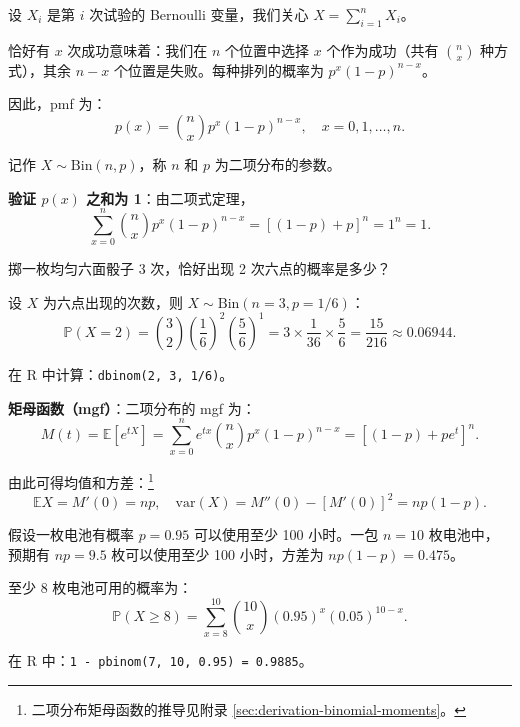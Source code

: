 设 $X_i$ 是第 $i$ 次试验的 Bernoulli 变量，我们关心 $X = \sum_{i=1}^{n} X_i$。

恰好有 $x$ 次成功意味着：我们在 $n$ 个位置中选择 $x$ 个作为成功（共有 $\binom{n}{x}$ 种方式），其余 $n-x$ 个位置是失败。每种排列的概率为 $p^x(1-p)^{n-x}$。

因此，pmf 为：
\begin{equation}\label{eq:binomial-pmf-ch3}
p(x) = \binom{n}{x} p^{x}(1-p)^{n-x}, \quad x = 0, 1, \ldots, n.
\end{equation}

记作 $X \sim \text{Bin}(n, p)$，称 $n$ 和 $p$ 为二项分布的参数。

\textbf{验证 $p(x)$ 之和为 1}：由二项式定理，
\[
\sum_{x=0}^{n} \binom{n}{x} p^{x}(1-p)^{n-x} = [(1-p) + p]^{n} = 1^{n} = 1.
\]

\begin{example}[骰子问题]\label{ex:binomial-dice-ch3}
掷一枚均匀六面骰子 3 次，恰好出现 2 次六点的概率是多少？

设 $X$ 为六点出现的次数，则 $X \sim \text{Bin}(n=3, p=1/6)$：
\[
\mathbb{P}(X=2) = \binom{3}{2} \left(\frac{1}{6}\right)^{2} \left(\frac{5}{6}\right)^{1} = 3 \times \frac{1}{36} \times \frac{5}{6} = \frac{15}{216} \approx 0.06944.
\]

在 R 中计算：\texttt{dbinom(2, 3, 1/6)}。
\end{example}

\textbf{矩母函数（mgf）}：二项分布的 mgf 为：
\begin{equation}\label{eq:binomial-mgf-ch3}
M(t) = \mathbb{E}[e^{tX}] = \sum_{x=0}^{n} e^{tx} \binom{n}{x} p^{x}(1-p)^{n-x} = [(1-p) + pe^{t}]^{n}.
\end{equation}

由此可得均值和方差：\footnote{二项分布矩母函数的推导见附录 \cref{sec:derivation-binomial-moments}。}
\begin{equation}\label{eq:binomial-moments-ch3}
\mathbb{E}X = M'(0) = np, \quad \text{var}(X) = M''(0) - [M'(0)]^{2} = np(1-p).
\end{equation}

\begin{example}[电池寿命]\label{ex:binomial-battery-ch3}
假设一枚电池有概率 $p = 0.95$ 可以使用至少 100 小时。一包 $n = 10$ 枚电池中，预期有 $np = 9.5$ 枚可以使用至少 100 小时，方差为 $np(1-p) = 0.475$。

至少 8 枚电池可用的概率为：
\[
\mathbb{P}(X \geq 8) = \sum_{x=8}^{10} \binom{10}{x} (0.95)^{x} (0.05)^{10-x}.
\]

在 R 中：\texttt{1 - pbinom(7, 10, 0.95) = 0.9885}。
\end{example}

